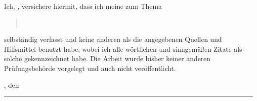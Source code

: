 \clearpage


Ich, \autorFullNameOneOhneLeerzeichen, versichere hiermit, dass ich meine \textbf{\kategorie} zum Thema
\begin{quote}
    \begin{center}
        \textbf{\projektKurztitel} \\
        \textit{\projektLangtitel}
    \end{center}
\end{quote}
selbständig verfasst und keine anderen als die angegebenen Quellen und Hilfsmittel benutzt habe,
wobei ich alle wörtlichen und sinngemäßen Zitate als solche gekennzeichnet habe. Die Arbeit
wurde bisher keiner anderen Prüfungsbehörde vorgelegt und auch nicht veröffentlicht.

\vspace{0.8cm}

\autorOrtOne, den \eidesstattlicheErklaerungDatum


\rule[-0.2cm]{5.5cm}{0.5pt} %

\textsc{\autorFullNameOne}